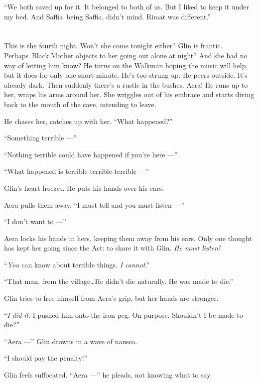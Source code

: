\documentclass[twoside,11pt,openany]{book}
\begin{document}
{}``We both saved up for it. It belonged to both of us. But I liked to keep it under my bed. And Saffia~being Saffia,
didn't mind. Rimat was different.''


\bigskip

\chapter{}

This is the fourth night. Won't she come tonight either? Glin is frantic. Perhaps~Black Mother objects to her going out
alone at night? And she had no way of letting him know? He turns on the Walkman hoping the music will help, but it does
for only one short minute. He's too strung up. He peers outside. It's already dark. Then suddenly there's a rustle in
the bushes. Aera! He runs up to her, wraps his arms around her. She wriggles out of his embrace and starts diving back
to the mouth of the cave, intending to leave.

 He chases her, catches up with her. ``What happened?''

``Something terrible ---''

``Nothing terrible could have happened if you're here ---''

``What happened is terrible-terrible-terrible ---''

Glin's heart freezes. He puts his hands over his ears.

Aera pulls them away. ``I must tell and you must listen ---''

``I don't want to ---''

Aera locks his hands in hers, keeping them away from his ears. Only one thought has kept her going since the
Act:  to share it with Glin. \textit{He must listen! }

``\textit{You} can know about terrible things. \textit{I cannot}.''

``That man, from the village{\ldots}He didn't die naturally. He was made to die.''

Glin tries to free himself from Aera's grip, but her hands are stronger.

``\textit{I} \textit{did it}. I pushed him onto the iron peg. On purpose. Shouldn't I be made to
die?''

``Aera ---'' Glin drowns in a wave of nausea.

``I should pay the penalty!''

Glin feels suffocated. ``Aera ---'' he pleads, not knowing what to say.
\end{document}
